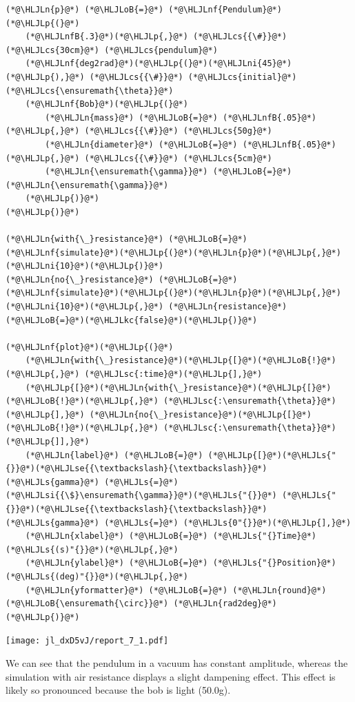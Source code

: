 \documentclass[12pt,a4paper]{article}
\newcommand{\HLJLkc}[1]{\textcolor[RGB]{59,151,46}{\textit{#1}}}
\newcommand{\HLJLn}[1]{#1}
\newcommand{\HLJLnf}[1]{\textcolor[RGB]{66,102,213}{#1}}
\newcommand{\HLJLs}[1]{\textcolor[RGB]{201,61,57}{#1}}
\newcommand{\HLJLsc}[1]{\textcolor[RGB]{201,61,57}{#1}}
\newcommand{\HLJLse}[1]{\textcolor[RGB]{59,151,46}{#1}}
\newcommand{\HLJLsi}[1]{#1}
\newcommand{\HLJLnfB}[1]{\textcolor[RGB]{59,151,46}{#1}}
\newcommand{\HLJLni}[1]{\textcolor[RGB]{59,151,46}{#1}}
\newcommand{\HLJLoB}[1]{\textcolor[RGB]{102,102,102}{\textbf{#1}}}
\newcommand{\HLJLp}[1]{#1}
\newcommand{\HLJLcs}[1]{\textcolor[RGB]{153,153,119}{\textit{#1}}}
\begin{document}
\begin{lstlisting}
(*@\HLJLn{p}@*) (*@\HLJLoB{=}@*) (*@\HLJLnf{Pendulum}@*)(*@\HLJLp{(}@*)
    (*@\HLJLnfB{.3}@*)(*@\HLJLp{,}@*) (*@\HLJLcs{{\#}}@*) (*@\HLJLcs{30cm}@*) (*@\HLJLcs{pendulum}@*)
    (*@\HLJLnf{deg2rad}@*)(*@\HLJLp{(}@*)(*@\HLJLni{45}@*)(*@\HLJLp{),}@*) (*@\HLJLcs{{\#}}@*) (*@\HLJLcs{initial}@*) (*@\HLJLcs{\ensuremath{\theta}}@*)
    (*@\HLJLnf{Bob}@*)(*@\HLJLp{(}@*)
        (*@\HLJLn{mass}@*) (*@\HLJLoB{=}@*) (*@\HLJLnfB{.05}@*)(*@\HLJLp{,}@*) (*@\HLJLcs{{\#}}@*) (*@\HLJLcs{50g}@*)
        (*@\HLJLn{diameter}@*) (*@\HLJLoB{=}@*) (*@\HLJLnfB{.05}@*)(*@\HLJLp{,}@*) (*@\HLJLcs{{\#}}@*) (*@\HLJLcs{5cm}@*)
        (*@\HLJLn{\ensuremath{\gamma}}@*) (*@\HLJLoB{=}@*) (*@\HLJLn{\ensuremath{\gamma}}@*)
    (*@\HLJLp{)}@*)
(*@\HLJLp{)}@*)

(*@\HLJLn{with{\_}resistance}@*) (*@\HLJLoB{=}@*) (*@\HLJLnf{simulate}@*)(*@\HLJLp{(}@*)(*@\HLJLn{p}@*)(*@\HLJLp{,}@*) (*@\HLJLni{10}@*)(*@\HLJLp{)}@*)
(*@\HLJLn{no{\_}resistance}@*) (*@\HLJLoB{=}@*) (*@\HLJLnf{simulate}@*)(*@\HLJLp{(}@*)(*@\HLJLn{p}@*)(*@\HLJLp{,}@*) (*@\HLJLni{10}@*)(*@\HLJLp{,}@*) (*@\HLJLn{resistance}@*)(*@\HLJLoB{=}@*)(*@\HLJLkc{false}@*)(*@\HLJLp{)}@*)

(*@\HLJLnf{plot}@*)(*@\HLJLp{(}@*)
    (*@\HLJLn{with{\_}resistance}@*)(*@\HLJLp{[}@*)(*@\HLJLoB{!}@*)(*@\HLJLp{,}@*) (*@\HLJLsc{:time}@*)(*@\HLJLp{],}@*)
    (*@\HLJLp{[}@*)(*@\HLJLn{with{\_}resistance}@*)(*@\HLJLp{[}@*)(*@\HLJLoB{!}@*)(*@\HLJLp{,}@*) (*@\HLJLsc{:\ensuremath{\theta}}@*)(*@\HLJLp{],}@*) (*@\HLJLn{no{\_}resistance}@*)(*@\HLJLp{[}@*)(*@\HLJLoB{!}@*)(*@\HLJLp{,}@*) (*@\HLJLsc{:\ensuremath{\theta}}@*)(*@\HLJLp{]],}@*)
    (*@\HLJLn{label}@*) (*@\HLJLoB{=}@*) (*@\HLJLp{[}@*)(*@\HLJLs{"{}}@*)(*@\HLJLse{{\textbackslash}{\textbackslash}}@*)(*@\HLJLs{gamma}@*) (*@\HLJLs{=}@*) (*@\HLJLsi{{\$}\ensuremath{\gamma}}@*)(*@\HLJLs{"{}}@*) (*@\HLJLs{"{}}@*)(*@\HLJLse{{\textbackslash}{\textbackslash}}@*)(*@\HLJLs{gamma}@*) (*@\HLJLs{=}@*) (*@\HLJLs{0"{}}@*)(*@\HLJLp{],}@*)
    (*@\HLJLn{xlabel}@*) (*@\HLJLoB{=}@*) (*@\HLJLs{"{}Time}@*) (*@\HLJLs{(s)"{}}@*)(*@\HLJLp{,}@*)
    (*@\HLJLn{ylabel}@*) (*@\HLJLoB{=}@*) (*@\HLJLs{"{}Position}@*) (*@\HLJLs{(deg)"{}}@*)(*@\HLJLp{,}@*)
    (*@\HLJLn{yformatter}@*) (*@\HLJLoB{=}@*) (*@\HLJLn{round}@*) (*@\HLJLoB{\ensuremath{\circ}}@*) (*@\HLJLn{rad2deg}@*)
(*@\HLJLp{)}@*)
\end{lstlisting}

\texttt{[image: jl\_dxD5vJ/report\_7\_1.pdf]}

We can see that the pendulum in a vacuum has constant amplitude, whereas the simulation with air resistance displays a slight dampening effect. This effect is likely so pronounced because the bob is light (50.0g).
\end{document}
